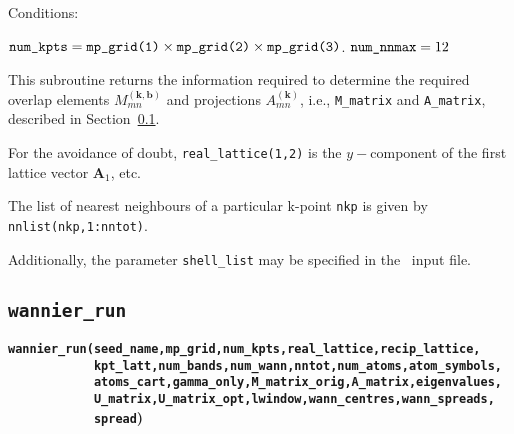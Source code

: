 
Conditions:
\begin{itemize}
\cond $\verb#num_kpts# = \verb#mp_grid(1)# \times \verb#mp_grid(2)#
\times \verb#mp_grid(3)#$.
\cond $\verb#num_nnmax# = 12$
\end{itemize}

This subroutine returns the information required to determine the
required overlap elements $M_{mn}^{(\mathbf{k,b})}$ and
projections $A_{mn}^{(\mathbf{k})}$,
i.e., \verb#M_matrix# and \verb#A_matrix#, described in
Section~\ref{wannier_run}. 

For the avoidance of doubt, \verb#real_lattice(1,2)# is the
$y-$component of the first lattice vector $\mathbf{A}_{1}$, etc.

The list of nearest neighbours of a particular k-point \verb#nkp# is
given by \verb#nnlist(nkp,1:nntot)#.

Additionally, the parameter \verb#shell_list#
may be specified in the \wannier\ input file.

\subsection{{\tt wannier\_run}} \label{wannier_run}

{\noindent \bf \verb#wannier_run(seed_name,mp_grid,num_kpts,real_lattice,recip_lattice,#\\
\verb#            kpt_latt,num_bands,num_wann,nntot,num_atoms,atom_symbols,#\\
\verb#            atoms_cart,gamma_only,M_matrix_orig,A_matrix,eigenvalues,#\\
\verb#            U_matrix,U_matrix_opt,lwindow,wann_centres,wann_spreads,#\\
\verb#            spread#)}

